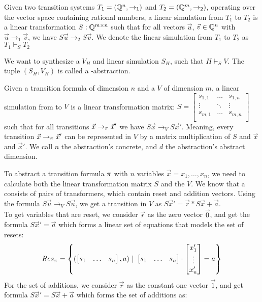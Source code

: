 \begin{mydef}
	Given two transition systems $T_1 = ( \mathbb{Q} ^n, \rightarrow_1)$ and $T_2 = ( \mathbb{Q} ^m, \rightarrow_2)$, operating over the vector space containing rational numbers, a linear simulation from $T_1$ to $T_2$ is a linear transformation $S:  \mathbb{Q} ^{m \times n}$ such that for all vectors $\vec{u}$, $\vec{v} \in  \mathbb{Q} ^n$ with $\vec{u} \rightarrow_1 \vec{v}$, we have $S\vec{u} \rightarrow_2 S\vec{v}$. We denote the linear simulation from $T_1$ to $T_2$ as $T_1 \vdash_S T_2$
\end{mydef}
We want to synthesize a \qvasr $V_H$ and linear simulation $S_H$, such that $H \vdash_S V$. The tuple $(S_H, V_H)$ is called a \qvasr-abstraction.
\begin{mydef}
	Given a transition formula \trf of dimension $n$ and a \qvasr $V$ of dimension $m$, a linear simulation from \trf to $V$ is a linear transformation matrix: 
	$S = 
	\begin{bmatrix}
		s_{1 ,1} & \ldots & s_{1, n} \\
		\vdots & \ddots & \vdots \\
		s_{m ,1} & \ldots & s_{m, n} \\
	\end{bmatrix}$ 
	such that for all transitions $\vec{x} \rightarrow_\pi \vec{x}'$ we have $S\vec{x} \rightarrow_V S\vec{x}'$. Meaning, every transition $\vec{x} \rightarrow_\pi \vec{x}'$ can be represented in $V$ by a matrix multiplication of $S$ and $\vec{x}$ and $\vec{x}'$. We call $n$ the abstraction's concrete, and $d$ the abstraction's abstract dimension. 
\end{mydef}
To abstract a transition formula $\pi$ with $n$ variables $\vec{x} = x_1, \ldots, x_n$, we need to calculate both the linear transformation matrix $S$ and the \qvasr $V$. We know that a \qvasr consists of pairs of transformers, which contain reset and addition vectors. Using the formula $S \vec{u} \rightarrow_V S\vec{u}$, we get a transition in $V$ as $S\vec{x}' = \vec{r}*S\vec{x} + \vec{a}$. \\ To get variables that are reset, we consider $\vec{r}$ as the zero vector $\vec{0}$, and get the formula $S\vec{x}' = \vec{a}$ which forms a linear set of equations that models the set of resets:
\begin{equation*}
	Res_\pi = \left\{ (\begin{bmatrix} s_1 & \ldots &s_n \end{bmatrix}, a)\ |\ \begin{bmatrix} s_1 & \ldots &s_n \end{bmatrix} \cdot \begin{bmatrix} x_1' \\ \vdots \\ x_n' \end{bmatrix} = a \right\}	
\end{equation*}
For the set of additions, we consider $\vec{r}$ as the constant one vector $\vec{1}$, and get formula $S\vec{x}' = S\vec{x} + \vec{a}$ which forms the set of additions as:
